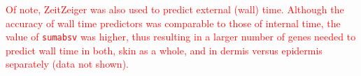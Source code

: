 \textcolor{red}{Of note, ZeitZeiger was also used to predict external (wall) time. Although the accuracy of wall time predictors was comparable to those of internal time, the value of \texttt{sumabsv} was higher, thus resulting in a larger number of genes needed to predict wall time in both, skin as a whole, and in dermis versus epidermis separately (data not shown).}\\




